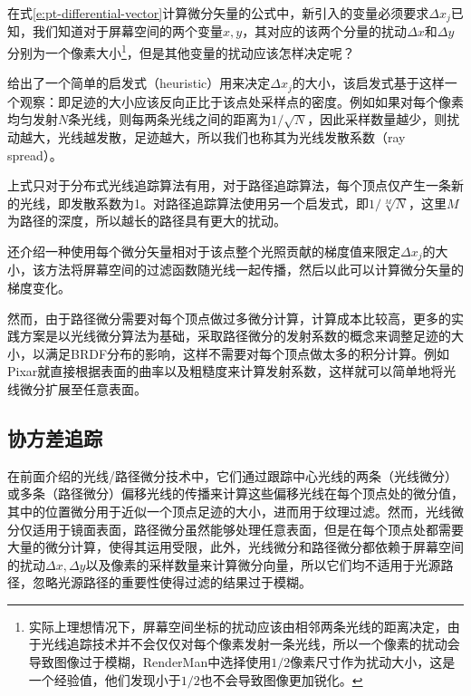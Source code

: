 在式\ref{e:pt-differential-vector}计算微分矢量的公式中，新引入的变量必须要求$\Delta x_j$已知，我们知道对于屏幕空间的两个变量$x,y$，其对应的该两个分量的扰动$\Delta x$和$\Delta y$分别为一个像素大小\footnote{实际上理想情况下，屏幕空间坐标的扰动应该由相邻两条光线的距离决定，由于光线追踪技术并不会仅仅对每个像素发射一条光线，所以一个像素的扰动会导致图像过于模糊，RenderMan中选择使用$1/2$像素尺寸作为扰动大小，这是一个经验值，他们发现小于$1/2$也不会导致图像更加锐化。}，但是其他变量的扰动应该怎样决定呢？

\cite{a:Pathdifferentialsandapplications}给出了一个简单的启发式（heuristic）用来决定$\Delta x_j$的大小，该启发式基于这样一个观察：即足迹的大小应该反向正比于该点处采样点的密度。例如如果对每个像素均匀发射$N$条光线，则每两条光线之间的距离为$1/\sqrt{N}$，因此采样数量越少，则扰动越大，光线越发散，足迹越大，所以我们也称其为光线发散系数（ray spread）。

上式只对于分布式光线追踪算法有用，对于路径追踪算法，每个顶点仅产生一条新的光线，即发散系数为1。\cite{a:Pathdifferentialsandapplications}对路径追踪算法使用另一个启发式，即$1/\sqrt[M]{N}$，这里$M$为路径的深度，所以越长的路径具有更大的扰动。


\cite{a:Pathdifferentialsandapplications}还介绍一种使用每个微分矢量相对于该点整个光照贡献的梯度值来限定$\Delta x_j$的大小，该方法将屏幕空间的过滤函数随光线一起传播，然后以此可以计算微分矢量的梯度变化。

然而，由于路径微分需要对每个顶点做过多微分计算，计算成本比较高，更多的实践方案是以光线微分算法为基础，采取路径微分的发射系数的概念来调整足迹的大小，以满足BRDF分布的影响，这样不需要对每个顶点做太多的积分计算。例如Pixar就直接根据表面的曲率以及粗糙度来计算发射系数，这样就可以简单地将光线微分扩展至任意表面。







\subsection{协方差追踪}\label{sec:pt-covariance-tracing}
在前面介绍的光线/路径微分技术中，它们通过跟踪中心光线的两条（光线微分）或多条（路径微分）偏移光线的传播来计算这些偏移光线在每个顶点处的微分值，其中的位置微分用于近似一个顶点足迹的大小，进而用于纹理过滤。然而，光线微分仅适用于镜面表面，路径微分虽然能够处理任意表面，但是在每个顶点处都需要大量的微分计算，使得其运用受限，此外，光线微分和路径微分都依赖于屏幕空间的扰动$\Delta x,\Delta y$以及像素的采样数量来计算微分向量，所以它们均不适用于光源路径，忽略光源路径的重要性使得过滤的结果过于模糊。

